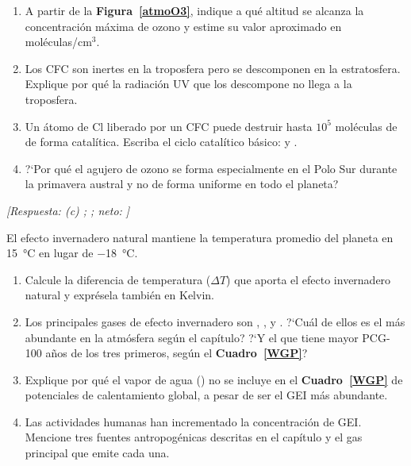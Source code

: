 \begin{bloque_ejercicios}
\begin{ejercicios}
\begin{enumerate}[label=\alph*)]
    \item A partir de la \textbf{Figura~\ref{atmoO3}}, indique
          a qu\'e altitud se alcanza la concentraci\'on m\'axima
          de ozono y estime su valor aproximado en
          mol\'eculas/cm$^3$.
    \item Los CFC son inertes en la troposfera pero se descomponen
          en la estratosfera. Explique por qu\'e la radiaci\'on UV
          que los descompone no llega a la troposfera.
    \item Un \'atomo de Cl liberado por un CFC puede destruir
          hasta $10^5$ mol\'eculas de  de forma catal\'itica.
          Escriba el ciclo catal\'itico b\'asico:
           \underline{\hspace{2cm}} y
           \underline{\hspace{2cm}}.
    \item ?`Por qu\'e el agujero de ozono se forma especialmente
          en el Polo Sur durante la primavera austral y no de forma
          uniforme en todo el planeta?
\end{enumerate}

\textit{[Respuesta: (c) ;
;
neto: ]}

\item El efecto invernadero natural mantiene la temperatura
promedio del planeta en \SI{15}{\celsius} en lugar de
\SI{-18}{\celsius}.

\begin{enumerate}[label=\alph*)]
    \item Calcule la diferencia de temperatura ($\Delta T$) que
          aporta el efecto invernadero natural y expr\'esela
          tambi\'en en Kelvin.
    \item Los principales gases de efecto invernadero son
          , ,  y . ?`Cu\'al de
          ellos es el m\'as abundante en la atm\'osfera seg\'un
          el cap\'itulo? ?`Y el que tiene mayor PCG-100 a\~nos
          de los tres primeros, seg\'un el \textbf{Cuadro~\ref{WGP}}?
    \item Explique por qu\'e el vapor de agua () no se
          incluye en el \textbf{Cuadro~\ref{WGP}} de potenciales
          de calentamiento global, a pesar de ser el GEI m\'as
          abundante.
    \item Las actividades humanas han incrementado la concentraci\'on
          de GEI. Mencione tres fuentes antropog\'enicas descritas
          en el cap\'itulo y el gas principal que emite cada una.
\end{enumerate}


\end{ejercicios}
\end{bloque_ejercicios}
